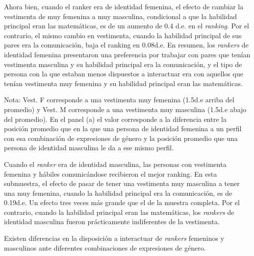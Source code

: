  
Ahora bien, cuando el ranker era de identidad femenina, el efecto de cambiar la vestimenta de muy femenina a muy masculina, condicional a que la habilidad principal eran las matemáticas, es de un aumento de 0.4 d.e. en el \textit{ranking}. Por el contrario, el mismo cambio en vestimenta, cuando la habilidad principal de sus pares era la comunicación, baja el ranking en 0.08d.e. En resumen, los \textit{rankers} de identidad femenina presentaron una preferencia por trabajar con pares que tenían vestimenta masculina y su habilidad principal era la comunicación, y el tipo de persona con la que estaban menos dispuestos a interactuar era con aquellos que tenían vestimenta muy femenina y su habilidad principal eran las matemáticas. 

\begin{table}[htbp]
    \centering
    \caption{Diferencia en ranking por género del ranker}
    \label{tab:Diffs}

    \fontsize{9.5}{12}

    \begin{threeparttable} 
    \begin{tablenotes}
    \scriptsize{
    \item Nota: Vest. F corresponde a una vestimenta muy femenina (1.5d.e arriba del promedio) y Vest. M corresponde a una vestimenta muy masculina (1.5d.e abajo del promedio). En el panel (a) el valor corresponde a la diferencia entre la posición promedio que en la que una persona de identidad femenina a un perfil con esa combinación de expresiones de género y la posición promedio que una persona de identidad masculina le da a ese mismo perfil.} 
    \end{tablenotes}
    \end{threeparttable}
\end{table}

Cuando el \textit{ranker} era de identidad masculina, las personas con vestimenta femenina y hábiles comunicándose recibieron el mejor ranking. En esta submuestra, el efecto de pasar de tener una vestimenta muy masculina a tener una muy femenina, cuando la habilidad principal era la comunicación, es de 0.19d.e. Un efecto tres veces más grande que el de la muestra completa. Por el contrario, cuando la habilidad principal eran las matemáticas, los \textit{rankers} de identidad masculina fueron prácticamente indiferentes de la vestimenta. 


\begin{result}
Existen diferencias en la disposición a interactuar de \textit{rankers} femeninos y masculinos ante diferentes combinaciones de expresiones de género. 
\end{result}

